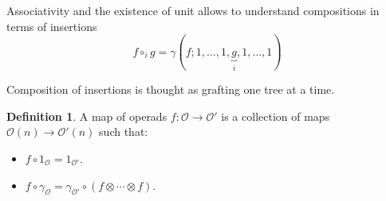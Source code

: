 \documentclass{beamer}
\theoremstyle{definition}
\newtheorem{defi}{Definition}
\begin{document}
\begin{frame}
	Associativity and the existence of unit allows to understand compositions in terms of insertions $$f\circ_i g=\gamma(f;1,\dots, 1,\underbrace{g}_{i},1,\dots, 1)$$ \pause
	
	Composition of insertions is thought as grafting one tree at a time.
\end{frame}
\begin{frame}
	\begin{defi}
	 A map of operads $f:\mathcal{O}\to \mathcal{O}'$ is a collection of maps $\mathcal{O}(n)\to \mathcal{O}'(n)$ such that:
		\begin{itemize}
			\item<1->   $f\circ 1_\mathcal{O}=1_{\mathcal{O}'}$.
			\item<2->  $f\circ \gamma_\mathcal{O}=\gamma_{\mathcal{O}'}\circ (f\otimes\cdots\otimes f)$.
		\end{itemize}
	\end{defi}
	
	
\end{frame}
%	
\end{document}
